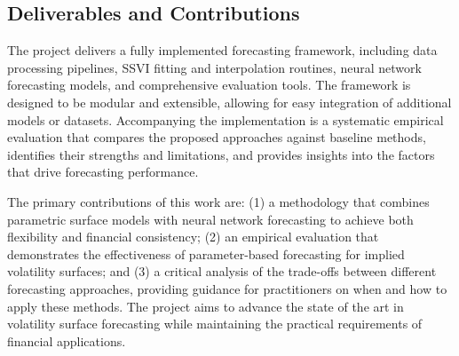 \subsection{Deliverables and Contributions}

The project delivers a fully implemented forecasting framework, including data processing pipelines, SSVI fitting and interpolation routines, neural network forecasting models, and comprehensive evaluation tools. The framework is designed to be modular and extensible, allowing for easy integration of additional models or datasets. Accompanying the implementation is a systematic empirical evaluation that compares the proposed approaches against baseline methods, identifies their strengths and limitations, and provides insights into the factors that drive forecasting performance.

The primary contributions of this work are: (1) a methodology that combines parametric surface models with neural network forecasting to achieve both flexibility and financial consistency; (2) an empirical evaluation that demonstrates the effectiveness of parameter-based forecasting for implied volatility surfaces; and (3) a critical analysis of the trade-offs between different forecasting approaches, providing guidance for practitioners on when and how to apply these methods. The project aims to advance the state of the art in volatility surface forecasting while maintaining the practical requirements of financial applications.












